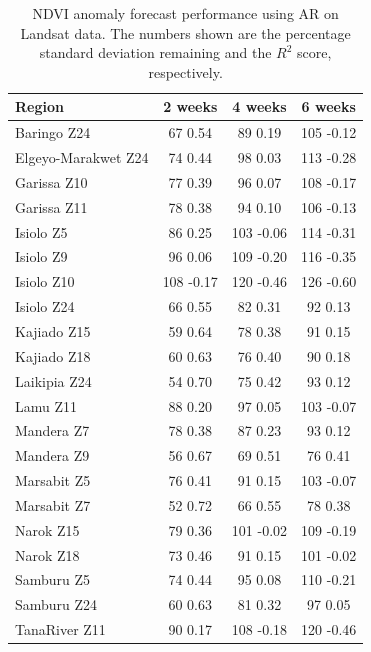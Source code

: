 \documentclass[review]{elsarticle}
\begin{document}
\begin{table}
	\footnotesize
	\caption{NDVI anomaly forecast performance using AR on Landsat data. The numbers shown are the percentage standard deviation remaining and the $R^2$ score, respectively.} \label{tab:NDVI_Landsat_AR}
	\centering
	\begin{tabular}{l|ccc} 
		\toprule
		\textbf{Region}  &  \textbf{2 weeks} &  \textbf{4 weeks}  & \textbf{6 weeks}  \\
		\midrule
		Baringo Z24 	& 	67 	0.54 	& 	89 	0.19 	& 	105 	-0.12\\
		Elgeyo-Marakwet Z24 	& 	74 	0.44 	& 	98 	0.03 	& 	113 	-0.28\\
		Garissa Z10 	& 	77 	0.39 	& 	96 	0.07 	& 	108 	-0.17\\
		Garissa Z11 	& 	78 	0.38 	& 	94 	0.10 	& 	106 	-0.13\\
		Isiolo Z5 	& 	86 	0.25 	& 	103 	-0.06 	& 	114 	-0.31\\
		Isiolo Z9 	& 	96 	0.06 	& 	109 	-0.20 	& 	116 	-0.35\\
		Isiolo Z10 	& 	108 	-0.17 	& 	120 	-0.46 	& 	126 	-0.60\\
		Isiolo Z24 	& 	66 	0.55 	& 	82 	0.31 	& 	92 	0.13\\
		Kajiado Z15 	& 	59 	0.64 	& 	78 	0.38 	& 	91 	0.15\\
		Kajiado Z18 	& 	60 	0.63 	& 	76 	0.40 	& 	90 	0.18\\
		Laikipia Z24 	& 	54 	0.70 	& 	75 	0.42 	& 	93 	0.12\\
		Lamu Z11 	& 	88 	0.20 	& 	97 	0.05 	& 	103 	-0.07\\
		Mandera Z7 	& 	78 	0.38 	& 	87 	0.23 	& 	93 	0.12\\
		Mandera Z9 	& 	56 	0.67 	& 	69 	0.51 	& 	76 	0.41\\
		Marsabit Z5 	& 	76 	0.41 	& 	91 	0.15 	& 	103 	-0.07\\
		Marsabit Z7 	& 	52 	0.72 	& 	66 	0.55 	& 	78 	0.38\\
		Narok Z15 	& 	79 	0.36 	& 	101 	-0.02 	& 	109 	-0.19\\
		Narok Z18 	& 	73 	0.46 	& 	91 	0.15 	& 	101 	-0.02\\
		Samburu Z5 	& 	74 	0.44 	& 	95 	0.08 	& 	110 	-0.21\\
		Samburu Z24 	& 	60 	0.63 	& 	81 	0.32 	& 	97 	0.05\\
		TanaRiver Z11 	& 	90 	0.17 	& 	108 	-0.18 	& 	120 	-0.46\\

\end{tabular}
\end{table}
\end{document}
